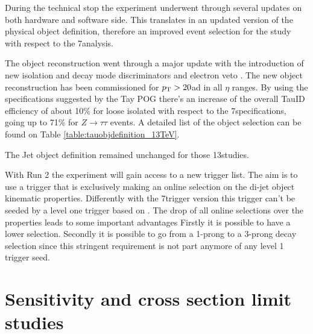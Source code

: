 During the technical stop the experiment underwent through several updates on both hardware and software side. This	translates in an updated version of the physical object definition, therefore an improved event selection for the study with respect to the 7\tev analysis.

The \hadtau object reconstruction went through a major update with the introduction of new isolation and decay mode discriminators and electron veto \cite{bib:TauID_13tev}. The new \hadtau object reconstruction has been commissioned for $p_{\text{T}} > 20$\gev ad in all $\eta$ ranges. By using the specifications suggested by the Tay POG there's an increase of the overall TauID efficiency of about 10\% for loose isolated \hadtau with respect to the 7\tev specifications, going up to 71\% for $Z \longrightarrow\tau\tau$ events\cite{bib:TauID_13tev}. A detailed list of the \hadtau object selection can be found on Table \ref{table:tauobjdefinition_13TeV}.

The Jet object definition remained unchanged for those 13\tev studies.


With Run 2 the experiment will gain access to a new trigger list. The aim is to use a trigger that is exclusively making an online selection on the di-jet object kinematic properties. Differently with the 7\tev trigger version this trigger can't be seeded by a level one trigger based on \met. The drop of all online selections over the \hadtau properties leads to some important advantages Firstly it is possible to have a lower \hadtau \pt selection. Secondly it is possible to go from a 1-prong to a 3-prong decay selection since this stringent requirement is not part anymore of any level 1 trigger seed. 

\section{Sensitivity and cross section limit studies}



